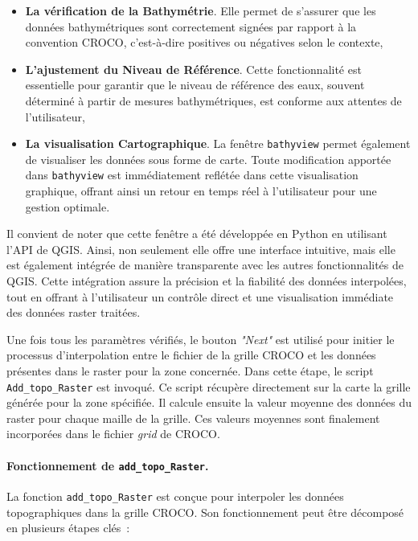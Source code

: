 {\begin{itemize}
	\item \textbf{La vérification de la Bathymétrie}. Elle permet de s'assurer que les données bathymétriques sont correctement signées par rapport à la convention CROCO, c'est-à-dire positives ou négatives selon le contexte,

	\item \textbf{L'ajustement du Niveau de Référence}. Cette fonctionnalité est essentielle pour garantir que le niveau de référence des eaux, souvent déterminé à partir de mesures bathymétriques, est conforme aux attentes de l'utilisateur,

	\item \textbf{La visualisation Cartographique}. La fenêtre \texttt{bathyview} permet également de visualiser les données sous forme de carte. Toute modification apportée dans \texttt{bathyview} est immédiatement reflétée dans cette visualisation graphique, offrant ainsi un retour en temps réel à l'utilisateur pour une gestion optimale.
\end{itemize}

Il convient de noter que cette fenêtre a été développée en Python en utilisant l'API de QGIS. Ainsi, non seulement elle offre une interface intuitive, mais elle est également intégrée de manière transparente avec les autres fonctionnalités de QGIS. Cette intégration assure la précision et la fiabilité des données interpolées, tout en offrant à l'utilisateur un contrôle direct et une visualisation immédiate des données raster traitées.
\newpage

Une fois tous les paramètres vérifiés, le bouton \textit{"Next"} est utilisé pour initier le processus d'interpolation entre le fichier de la grille CROCO et les données présentes dans le raster pour la zone concernée. Dans cette étape, le script \texttt{Add\_topo\_Raster} est invoqué. Ce script récupère directement sur la carte la grille générée pour la zone spécifiée. Il calcule ensuite la valeur moyenne des données du raster pour chaque maille de la grille. Ces valeurs moyennes sont finalement incorporées dans le fichier \og \textit{grid} \fg{} de CROCO.\\

\paragraph{Fonctionnement de \texttt{add\_topo\_Raster}.\\}

La fonction \texttt{add\_topo\_Raster} est conçue pour interpoler les données topographiques dans la grille CROCO. Son fonctionnement peut être décomposé en plusieurs étapes clés~:

}

